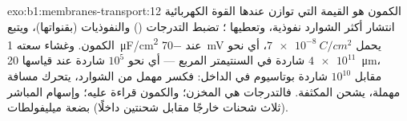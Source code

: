 \begin{solution}{exo:b1:membranes-transport:12}
الكمون هو القيمة التي توازن عندها القوة الكهربائية انتشار أكثر
الشوارد نفوذية، وتعطيها ؛  تضبط التدرجات
() والنفوذيات (بقنواتها)، ويتبع الكمون. وغشاء سعته
\qty{1}{\micro F/cm^2} عند \qty{-70}{mV} يحمل $\qty{7e-8}{C/cm^2}$،
أي نحو $\num{4e11}$ شاردة في السنتيمتر المربع --- أي نحو $10^5$ شاردة
عند  قياسها \qty{20}{\micro m}، مقابل $10^{10}$ شاردة بوتاسيوم في
الداخل: فكسر مهمل من الشوارد، يتحرك مسافة مهملة، يشحن المكثفة.
فالتدرجات هي المخزن؛ والكمون قراءة عليه؛ وإسهام  المباشر (ثلاث
شحنات خارجًا مقابل شحنتين داخلًا) بضعة ميليفولطات.
\end{solution}

